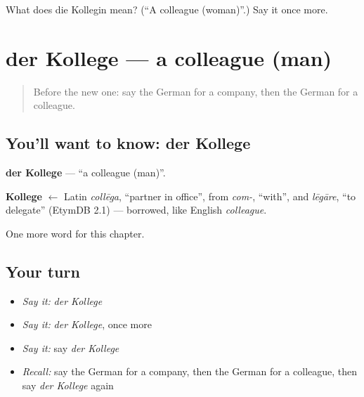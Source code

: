 \begin{tcolorbox}[breakable,colback=teal!4,colframe=teal!35!black,title={Before you move on}]
What does die Kollegin mean? (\textquotedblleft{}A colleague (woman)\textquotedblright{}.) Say it once more.
\end{tcolorbox}
\section[der Kollege]{der Kollege — a colleague (man)}

\label{lesson:GE-C154-kollege}



\begin{quote}
Before the new one: say the German for a company, then the German for a colleague.
\end{quote}

\subsection*{You'll want to know: der Kollege}
\textbf{der Kollege} — \textquotedblleft{}a colleague (man)\textquotedblright{}.

\begin{cousinweb}
\textbf{Kollege} $\leftarrow$ Latin \emph{collēga}, \textquotedblleft{}partner in office\textquotedblright{}, from \emph{com-}, \textquotedblleft{}with\textquotedblright{}, and \emph{lēgāre}, \textquotedblleft{}to delegate\textquotedblright{} (EtymDB 2.1) — borrowed, like English \emph{colleague}.
\end{cousinweb}

\begin{grammarlens}[title={What you've built}]
One more word for this chapter.
\end{grammarlens}

\subsection*{Your turn}
\begin{itemize}
\raggedright
  \item \emph{Say it:} \emph{der Kollege}
  \item \emph{Say it:} \emph{der Kollege}, once more
  \item \emph{Say it:} say \emph{der Kollege}
  \item \emph{Recall:} say the German for a company, then the German for a colleague, then say \emph{der Kollege} again
\end{itemize}

